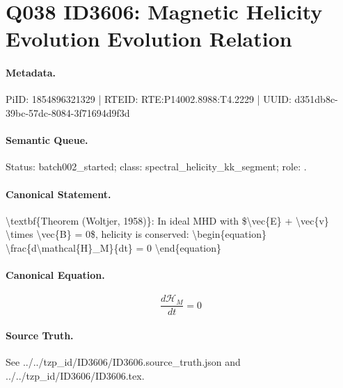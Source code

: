 \section*{Q038 ID3606: Magnetic Helicity Evolution Evolution Relation}
\paragraph{Metadata.}
PiID: 1854896321329 | RTEID: RTE:P14002.8988:T4.2229 | UUID: d351db8c-39bc-57dc-8084-3f71694d9f3d

\paragraph{Semantic Queue.}
Status: batch002\_started; class: spectral\_helicity\_kk\_segment; role: .

\paragraph{Canonical Statement.}
\textbackslash{}textbf\{Theorem (Woltjer, 1958)\}: In ideal MHD with \$\textbackslash{}vec\{E\} + \textbackslash{}vec\{v\} \textbackslash{}times \textbackslash{}vec\{B\} = 0\$, helicity is conserved: \textbackslash{}begin\{equation\} \textbackslash{}frac\{d\textbackslash{}mathcal\{H\}\_M\}\{dt\} = 0 \textbackslash{}end\{equation\}

\paragraph{Canonical Equation.}
\[
\begin{equation} \frac{d\mathcal{H}_M}{dt} = 0 \end{equation}
\]

\paragraph{Source Truth.}
See ../../tzp\_id/ID3606/ID3606.source\_truth.json and ../../tzp\_id/ID3606/ID3606.tex.
